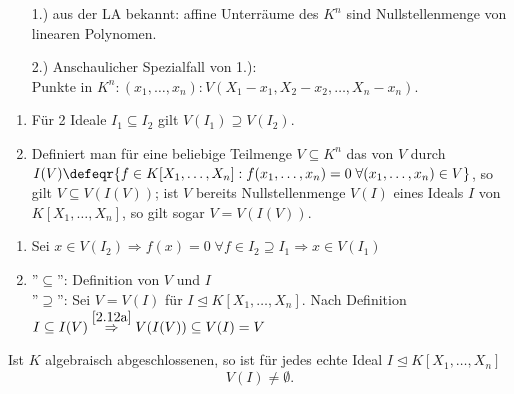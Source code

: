 \begin{nnBsp} 
  \begin{enumerate}
    \item[1.)] aus der LA bekannt: affine Unterräume des $K^n$ sind
               Nullstellenmenge von linearen Polynomen.
    \item[2.)] Anschaulicher Spezialfall von 1.):\\
               Punkte in $K^n: (x_1, \dots, x_n): V(X_1-x_1, X_2 - x_2, \dots,
               X_n - x_n)$.
  \end{enumerate}
\end{nnBsp}

\begin{BemDef}
  \begin{enumerate}
    \item \label{2.12a}Für 2 Ideale $I_1 \subseteq I_2$ gilt $V(I_1) \supseteq V(I_2)$.
    \item Definiert man für eine beliebige Teilmenge $V \subseteq K^n$ das                                          von $V$ durch $I(V) \defeqr \{ f \in K[X_1,         \dots, X_n]: f(x_1, \dots, x_n) = 0 \; \forall (x_1, \dots, x_n) \in V\}$, so gilt $V \subseteq          V(I(V))$; ist $V$ bereits Nullstellenmenge $V(I)$ eines Ideals $I$ von $K[X_1, \dots, X_n]$, so          gilt sogar $V = V(I(V))$.
  \end{enumerate}
\end{BemDef}

\begin{Bew}
  \begin{enumerate}
    \item Sei $x \in V(I_2) \Rightarrow f(x) = 0 \; \forall f \in I_2 \supseteq I_1 \Rightarrow x \in V(I_1)$
    \item ''$\subseteq$'': Definition von $V$ und $I$\\
          ''$\supseteq$'': Sei $V = V(I)$ für $I \trianglelefteq K[X_1, \dots, X_n]$.
	  Nach Definition $I \subseteq I(V) \overset{\ref{2.12a}}{\Rightarrow} V(I(V)) \subseteq V(I) = V$
  \end{enumerate}
\end{Bew}

\begin{nnSatz}
\label{SatzSchwach}
  Ist $K$ algebraisch abgeschlossenen, so ist für jedes echte Ideal $I \trianglelefteq K[X_1, \dots, X_n]$
   \[
   V(I) \not= \emptyset.
   \]
\end{nnSatz}

